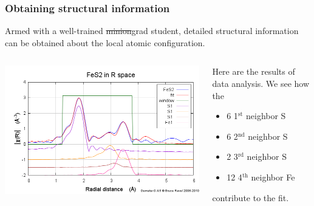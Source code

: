 \documentclass[10pt, xcolor=x11names, compress, handout]{beamer}
\begin{document}
\begin{frame}
  \frametitle{Obtaining structural information}
  Armed with a well-trained \sout{minion}\quad grad student, detailed
  structural information can be obtained about the local atomic
  configuration.

  \bigskip

  \begin{columns}
    \begin{column}{0.5\linewidth}
      \includegraphics[width=\linewidth]{JM/fes2_fit+paths.png}
    \end{column}
    \begin{column}{0.5\linewidth}
      Here are the results of data analysis.  We see how the
      \begin{itemize}
      \item {\color{Purple3}6 1$^{\mathrm{st}}$ neighbor S}
      \item {\color{DarkOrange3}6 2$^{\mathrm{nd}}$ neighbor S}
      \item {\color{Brown4}2 3$^{\mathrm{rd}}$ neighbor S}
      \item {\color{Magenta2}12 4$^{\mathrm{th}}$ neighbor Fe}
      \end{itemize}
      contribute to the fit.
    \end{column}
  \end{columns}
\end{frame}
\end{document}
